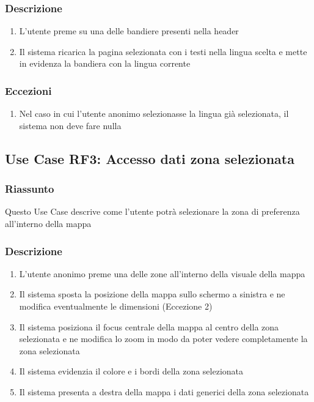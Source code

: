         \subsubsection{Descrizione}
            \begin{enumerate}
                \item L'utente preme su una delle bandiere presenti nella header
                \item Il sistema ricarica la pagina selezionata con i testi nella lingua scelta e mette in evidenza la bandiera con la lingua corrente
            \end{enumerate}
        \subsubsection{Eccezioni}
            \begin{enumerate}
                \item Nel caso in cui l'utente anonimo selezionasse la lingua già selezionata, il sistema non deve fare nulla
            \end{enumerate}

    \subsection{Use Case RF3: Accesso dati zona selezionata}
        \subsubsection{Riassunto}
            Questo Use Case descrive come l'utente potrà selezionare la zona di preferenza all'interno della mappa
        \subsubsection{Descrizione}
            \begin{enumerate}
                \item L'utente anonimo preme una delle zone all'interno della visuale della mappa
                \item Il sistema sposta la posizione della mappa sullo schermo a sinistra e ne modifica eventualmente le dimensioni (Eccezione 2)
                \item Il sistema posiziona il focus centrale della mappa al centro della zona selezionata e ne modifica lo zoom in modo da poter vedere completamente la zona selezionata
                \item Il sistema evidenzia il colore e i bordi della zona selezionata
                \item Il sistema presenta a destra della mappa i dati generici della zona selezionata
            \end{enumerate}
